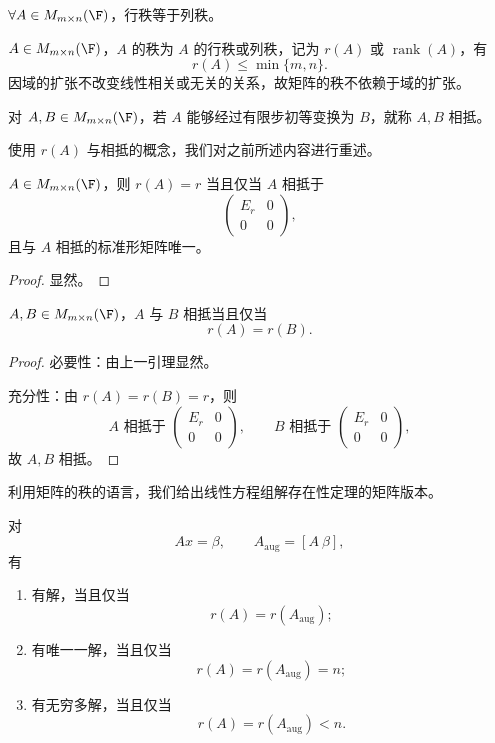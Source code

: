 \begin{theorem}
	$\forall A\in M_{m\times n}(\F)$，行秩等于列秩。
\end{theorem}

\begin{definition}
	$A\in M_{m\times n}(\F)$，$A$ 的秩为 $A$ 的行秩或列秩，记为 $r(A)$ 或 $\operatorname{rank}(A)$，有
	\[
	r(A)\leq\min\{m,n\}.
	\]
	因域的扩张不改变线性相关或无关的关系，故矩阵的秩不依赖于域的扩张。
	
	
\end{definition}
对 $A,B\in M_{m\times n}(\F)$，若 $A$ 能够经过有限步初等变换为 $B$，就称 $A,B$ 相抵。

使用 $r(A)$ 与相抵的概念，我们对之前所述内容进行重述。

\begin{lemma}
	$A\in M_{m\times n}(\F)$，则 $r(A)=r$ 当且仅当 $A$ 相抵于
	\[
	\begin{pmatrix}
		E_r&0\\
		0&0
	\end{pmatrix},
	\]
	且与 $A$ 相抵的标准形矩阵唯一。
\end{lemma}
\begin{proof}
	显然。
\end{proof}

\begin{proposition}
	$A,B\in M_{m\times n}(\F)$，$A$ 与 $B$ 相抵当且仅当
	\[
	r(A)=r(B).
	\]
\end{proposition}
\begin{proof}
	必要性：由上一引理显然。
	
	充分性：由 $r(A)=r(B)=r$，则
	\[
	A\text{ 相抵于 }
	\begin{pmatrix}
		E_r&0\\
		0&0
	\end{pmatrix},
	\qquad
	B\text{ 相抵于 }
	\begin{pmatrix}
		E_r&0\\
		0&0
	\end{pmatrix},
	\]
	故 $A,B$ 相抵。
\end{proof}

利用矩阵的秩的语言，我们给出线性方程组解存在性定理的矩阵版本。

\begin{proposition}\label{2.4.12}
	对
	\[
	Ax=\beta,
	\qquad
	A_{\mathrm{aug}}=[A\ \beta],
	\]
	有
	\begin{enumerate}
		\item 有解，当且仅当
		\[
		r(A)=r(A_{\mathrm{aug}});
		\]
		\item 有唯一一解，当且仅当
		\[
		r(A)=r(A_{\mathrm{aug}})=n;
		\]
		\item 有无穷多解，当且仅当
		\[
		r(A)=r(A_{\mathrm{aug}})<n.
		\]
	\end{enumerate}
\end{proposition}


